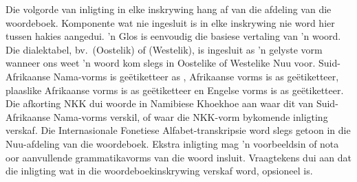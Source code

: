 Die volgorde van inligting in elke inskrywing hang af van die afdeling
van die woordeboek. Komponente wat nie ingesluit is in elke inskrywing
nie word hier tussen hakies aangedui. 'n Glos is eenvoudig die basiese
vertaling van 'n woord. Die dialektabel, bv.\ (Oostelik) of
(Westelik), is ingesluit as 'n gelyste vorm wanneer ons weet 'n woord
kom slegs in Oostelike of Westelike N\textipa{\textvertline}uu voor.
Suid-Afrikaanse Nama-vorms is ge\"{e}tiketteer as ,
Afrikaanse vorms is as  ge\"{e}tiketteer, plaaslike
Afrikaanse vorms is as 
ge\"{e}tiketteer en Engelse vorms is as 
ge\"{e}tiketteer.  Die afkorting NKK dui woorde in Namibiese Khoekhoe
aan waar dit van Suid-Afrikaanse Nama-vorms verskil, of waar die
NKK-vorm bykomende inligting verskaf. Die Internasionale Fonetiese
Alfabet-transkripsie word slegs getoon in die
N\textipa{\textvertline}uu-afdeling van die woordeboek. Ekstra
inligting mag 'n voorbeeldsin of nota oor aanvullende grammatikavorms
van die woord insluit.  Vraagtekens dui aan dat die inligting wat in
die woordeboekinskrywing verskaf word, opsioneel is. 

